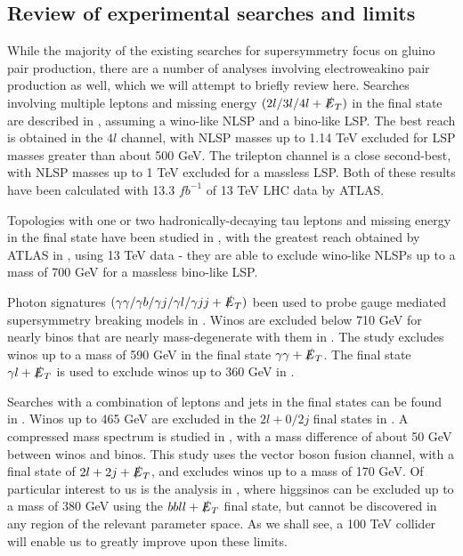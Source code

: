 \subsection{Review of experimental searches and limits}

While the majority of the existing searches for supersymmetry focus on gluino pair production, there are a number of analyses involving electroweakino pair production as well, which we will attempt to briefly review here. 
Searches involving multiple leptons and missing energy $(2l/3l/4l +\slashed{E}_T)$ in the final state are described in \citep{ATLAS:2016uwq,ATLAS:2016soo,Khachatryan:2014qwa,Chatrchyan:2012pka}, assuming a wino-like NLSP and a bino-like LSP. The best reach is obtained in the $4l$ channel, with NLSP masses up to 1.14 TeV excluded for LSP masses greater than about 500 GeV. The trilepton channel is a close second-best, with NLSP masses up to 1 TeV excluded for a massless LSP. Both of these results have been calculated with 13.3 $fb^{-1}$ of 13 TeV LHC data by ATLAS. 

Topologies with one or two hadronically-decaying tau leptons and missing energy in the final state have been studied in \citep{ATLAS:2016ety,Khachatryan:2016trj}, with the greatest reach obtained by ATLAS in \citep{ATLAS:2016ety}, using 13 TeV data - they are able to exclude wino-like NLSPs up to a mass of 700 GeV for a massless bino-like LSP. 

Photon signatures $(\gamma\gamma/\gamma b/\gamma j/\gamma l/\gamma j j + \slashed{E}_T)$ been used to probe gauge mediated supersymmetry breaking  models in \citep{Chatrchyan:2012bba,CMS:2015loa,Aad:2015hea,Khachatryan:2015exa,Khachatryan:2016hns}. Winos are excluded below 710 GeV for nearly binos that are nearly mass-degenerate with them in \citep{Khachatryan:2016hns}. The study \cite{Aad:2015hea} excludes winos up to a mass of 590 GeV in the final state $\gamma\gamma + \slashed{E}_T$.  The final state $\gamma l + \slashed{E}_T$ is used to exclude winos up to 360 GeV in \citep{CMS:2015loa}. 

Searches with a combination of leptons and jets in the final states can be found in \citep{Aad:2014vma,Khachatryan:2015kxa,Khachatryan:2014mma}. Winos up to 465 GeV are excluded in the $2l + 0/2j$ final states in \citep{Aad:2014vma}. A compressed mass spectrum is studied in \citep{Khachatryan:2015kxa}, with a mass difference of about 50 GeV between winos and binos. This study uses the vector boson fusion channel, with a final state of $2l + 2j + \slashed{E}_T$, and excludes winos up to a mass of 170 GeV. Of particular interest to us is the analysis in \citep{Khachatryan:2014mma}, where higgsinos can be excluded up to a mass of 380 GeV using the $bbll + \slashed{E}_T$ final state, but cannot be discovered in any region of the relevant parameter space. As we shall see, a 100 TeV collider will enable us to greatly improve upon these limits.


